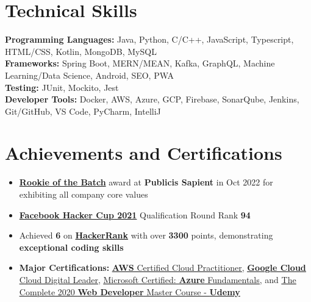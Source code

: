 \documentclass[letterpaper,13pt]{article}
\newcommand{\resumeItem}[1]{
  \item\small{
    {#1 \vspace{-2pt}}
  }
}
\newcommand{\resumeItemListStart}{\begin{itemize}}
\newcommand{\resumeItemListEnd}{\end{itemize}\vspace{-5pt}}
\begin{document}
\section{Technical Skills}
 \begin{itemize}[leftmargin=0.15in, label={}]
    \small{\item{
     \textbf{Programming Languages: }{Java, Python, C/C++, JavaScript, Typescript, HTML/CSS, Kotlin, MongoDB, MySQL} \\
     \textbf{Frameworks: }{Spring Boot, MERN/MEAN, Kafka, GraphQL, Machine Learning/Data Science, Android, SEO, PWA} \\
     \textbf{Testing: }{JUnit, Mockito, Jest} \\
     \textbf{Developer Tools: }{Docker, AWS, Azure, GCP, Firebase, SonarQube, Jenkins, Git/GitHub, VS Code, PyCharm, IntelliJ}
    }}
 \end{itemize}

\section{Achievements and Certifications}
  \resumeItemListStart      \resumeItem{\href{https://drive.google.com/file/d/1U9yLcTbFNVLfGm9tHbY7JiOYqgzFtAvm/view?usp=drive_link&usp=embed_facebook}{\textbf{Rookie of the Batch}} award at \textbf{Publicis Sapient} in Oct 2022 for exhibiting all company core values}
  \resumeItem{\href{https://www.facebook.com/codingcompetitions/hacker-cup/2021/certificate/530301721540794}{\textbf{Facebook Hacker Cup 2021}} Qualification Round Rank \textbf{94}}
  \resumeItem{Achieved \textbf{6 \faStar} on \href{https://www.hackerrank.com/profile/JayantGoel001}{\textbf{HackerRank}} with over \textbf{3300} points, demonstrating \textbf{exceptional coding skills}}\resumeItem{\textbf{Major Certifications:} \href{https://drive.google.com/file/d/15qgH3MU0gf9ww9uZuMcu4e2ezFcTaZK1/view?usp=drive_link}{\underline{\textbf{AWS} Certified Cloud Practitioner}}, \href{https://drive.google.com/file/d/1gxAfbcVD6_U8mtxzcrPHf1gZmZ5Z20xh/view?usp=drive_link}{\underline{\textbf{Google Cloud} Cloud Digital Leader}}, \href{https://drive.google.com/file/d/1_ghen3KbDJKEgsdudfGRUg77y8ytYC3L/view?usp=drive_link}{\underline{Microsoft Certified: \textbf{Azure} Fundamentals}}, and
      \href{https://drive.google.com/file/d/12THg9_3-KtjSRe7pLfw27_pqwkDtSQMx/view?usp=drive_link}{\underline{The Complete 2020 \textbf{Web Developer} Master Course - \textbf{Udemy}}}
      }
  \resumeItemListEnd
\end{document}
